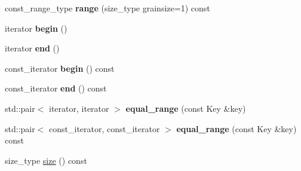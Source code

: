 \begin{DoxyCompactItemize}
\item 
\hypertarget{classtbb_1_1interface5_1_1concurrent__hash__map_a904058bdca16f5d3d209389c32ee6465}{}const\+\_\+range\+\_\+type {\bfseries range} (size\+\_\+type grainsize=1) const \label{classtbb_1_1interface5_1_1concurrent__hash__map_a904058bdca16f5d3d209389c32ee6465}

\item 
\hypertarget{classtbb_1_1interface5_1_1concurrent__hash__map_a5c999351f9b8ab78c61ce487d27ceb2d}{}iterator {\bfseries begin} ()\label{classtbb_1_1interface5_1_1concurrent__hash__map_a5c999351f9b8ab78c61ce487d27ceb2d}

\item 
\hypertarget{classtbb_1_1interface5_1_1concurrent__hash__map_a642a53f457a71c5529076535e15e6c7c}{}iterator {\bfseries end} ()\label{classtbb_1_1interface5_1_1concurrent__hash__map_a642a53f457a71c5529076535e15e6c7c}

\item 
\hypertarget{classtbb_1_1interface5_1_1concurrent__hash__map_a9a0f0ee20346ff74347e76810c620523}{}const\+\_\+iterator {\bfseries begin} () const \label{classtbb_1_1interface5_1_1concurrent__hash__map_a9a0f0ee20346ff74347e76810c620523}

\item 
\hypertarget{classtbb_1_1interface5_1_1concurrent__hash__map_a3555b096633f740bb0fd5e6064fd9d9e}{}const\+\_\+iterator {\bfseries end} () const \label{classtbb_1_1interface5_1_1concurrent__hash__map_a3555b096633f740bb0fd5e6064fd9d9e}

\item 
\hypertarget{classtbb_1_1interface5_1_1concurrent__hash__map_a1e7ff65326e5c0584863aad46a5f6433}{}std\+::pair$<$ iterator, iterator $>$ {\bfseries equal\+\_\+range} (const Key \&key)\label{classtbb_1_1interface5_1_1concurrent__hash__map_a1e7ff65326e5c0584863aad46a5f6433}

\item 
\hypertarget{classtbb_1_1interface5_1_1concurrent__hash__map_a8d931126ba43e2b725bbeb828fb53af5}{}std\+::pair$<$ const\+\_\+iterator, const\+\_\+iterator $>$ {\bfseries equal\+\_\+range} (const Key \&key) const \label{classtbb_1_1interface5_1_1concurrent__hash__map_a8d931126ba43e2b725bbeb828fb53af5}

\item 
\hypertarget{classtbb_1_1interface5_1_1concurrent__hash__map_a252731d8fa53963cc28fbc0e2172c4d0}{}size\+\_\+type \hyperlink{classtbb_1_1interface5_1_1concurrent__hash__map_a252731d8fa53963cc28fbc0e2172c4d0}{size} () const \label{classtbb_1_1interface5_1_1concurrent__hash__map_a252731d8fa53963cc28fbc0e2172c4d0}


\end{DoxyCompactItemize}
